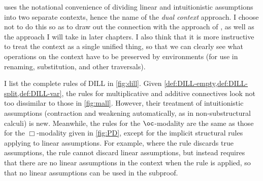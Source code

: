  uses the notational convenience of dividing linear and
intuitionistic assumptions into two separate contexts, hence the name of the
\emph{dual context} approach.
I choose not to do this so as to draw out the connection with the approach of
\citet{judgmental}, as well as the approach I will take in later chapters.
I also think that it is more instructive to treat the context as a single
unified thing, so that we can clearly see what operations on the context have
to be preserved by environments (for use in renaming, substitution, and other
traversals).

I list the complete rules of DILL in \cref{fig:dill}.
Given \cref{def:DILL-empty,def:DILL-split,def:DILL-var}, the rules for
multiplicative and additive connectives look not too dissimilar to those in
\cref{fig:mall}.
However, their treatment of intuitionistic assumptions (contraction and
weakening automatically, as in non-substructural calculi) is new.
Meanwhile, the rules for the $\oc$-modality are the same as those for
the $\Box$-modality given in \cref{fig:PD}, except for the implicit structural
rules applying to linear assumptions.
For example, where the  rule discards true assumptions, the
 rule cannot discard linear assumptions, but instead requires
that there are no linear assumptions in the context when the rule is applied, so
that no linear assumptions can be used in the subproof.

